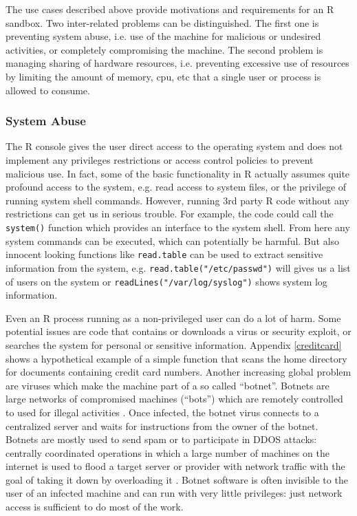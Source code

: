 \documentclass[article]{jss}
\newcommand{\R}{\textsf{R}\xspace}
\begin{document}
The use cases described above provide motivations and requirements for an
\R sandbox. Two inter-related problems can be distinguished. The first
one is preventing system abuse, i.e. use of the machine for malicious or
undesired activities, or completely compromising the machine. The second
problem is managing sharing of hardware resources, i.e. preventing excessive
use of resources by limiting the amount of memory, cpu, etc that a single user
or process is allowed to consume.

\subsubsection{System Abuse}

The \R console gives the user direct access to the operating system
and does not implement any privileges restrictions or access control policies to
prevent malicious use. In fact, some of the basic functionality in \R actually
assumes quite profound access to the system, e.g. read access to system files,
or the privilege of running system shell commands. However, running 3rd
party \R code without any restrictions can get us in serious
trouble. For example, the code could call the \texttt{system()} function which
provides an interface to the system shell. From here any system commands can be
executed, which can potentially be harmful. But also innocent looking functions
like \texttt{read.table} can be used to extract sensitive information from the
system, e.g. \texttt{read.table("/etc/passwd")} will gives us a list of users
on the system or \texttt{readLines("/var/log/syslog")} shows system log
information.

Even an \R process running as a non-privileged user can do a lot of
harm. Some potential issues are code that contains or downloads a virus or
security exploit, or searches the system for personal or sensitive information.
Appendix \ref{creditcard} shows a hypothetical example of a simple function that
scans the home directory for documents containing credit card numbers. Another
increasing global problem are viruses which make the machine part of a so called
``botnet''. Botnets are large networks of compromised machines (``bots'') which
are remotely controlled to used for illegal activities
\citep{abu2006multifaceted}. Once infected, the botnet virus connects to a
centralized server and waits for instructions from the owner of the botnet.
Botnets are mostly used to send spam or to participate in DDOS attacks:
centrally coordinated operations in which a large number of machines on the
internet is used to flood a target server or provider with network traffic with
the goal of taking it down by overloading it \citep{mirkovic2004taxonomy}. Botnet
software is often invisible to the user of an infected machine and can run with
very little privileges: just network access is sufficient to do most of the work.
\end{document}
